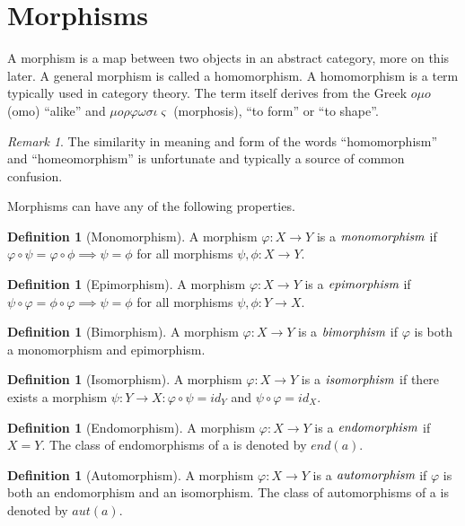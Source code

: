 \documentclass[10pt, oneside, reqno]{amsart}
\theoremstyle{plain}%
\theoremstyle{definition}
\newtheorem{defn}[thm]{Definition}
\theoremstyle{remark}
\newtheorem*{rem}{Remark}
\newcommand{\Id}{\mathit{id}_}
\begin{document}
\section{Morphisms} %
\label{sec:morphisms}
A morphism is a map between two objects in an abstract category, more on this later.
A general morphism is called a homomorphism. A homomorphism is a term typically used in category theory.
The term itself derives from the Greek $o \mu o$ (omo) ``alike'' and $\mu o \rho\varphi\omega\sigma\iota\varsigma$
(morphosis), ``to form'' or ``to shape''.
\begin{rem}
 The similarity in meaning and form of the words ``homomorphism'' and ``homeomorphism'' is unfortunate and typically
 a source of common confusion.
\end{rem}

Morphisms can have any of the following properties.

\begin{defn}[Monomorphism]
 A morphism $\varphi: X \to Y$ is a $\emph{monomorphism}$ if $\varphi \circ \psi = \varphi \circ \phi \implies \psi = \phi$ for all morphisms $\psi,\phi: X \to Y$.
\end{defn}

\begin{defn}[Epimorphism]
 A morphism $\varphi: X \to Y$ is a $\emph{epimorphism}$ if $\psi \circ \varphi = \phi \circ \varphi \implies \psi = \phi$ for all morphisms $\psi,\phi: Y \to X$.
\end{defn}
 
\begin{defn}[Bimorphism]
 A morphism $\varphi: X \to Y$ is a $\emph{bimorphism}$ if $\varphi$ is both a monomorphism and epimorphism.
\end{defn}

\begin{defn}[Isomorphism]
 A morphism $\varphi: X \to Y$ is a $\emph{isomorphism}$ if there exists a morphism $\psi: Y \to X : \varphi \circ \psi = \Id{Y}$ and $\psi \circ \varphi = \Id{X}$.
\end{defn}

\begin{defn}[Endomorphism]
 A morphism $\varphi: X \to Y$ is a $\emph{endomorphism}$ if $X = Y$.
 The class of endomorphisms of a is denoted by $end(a)$.
\end{defn}

\begin{defn}[Automorphism]
 A morphism $\varphi: X \to Y$ is a $\emph{automorphism}$ if $\varphi$ is both an endomorphism and an isomorphism.
 The class of automorphisms of a is denoted by $aut(a)$.
\end{defn}
\end{document}
